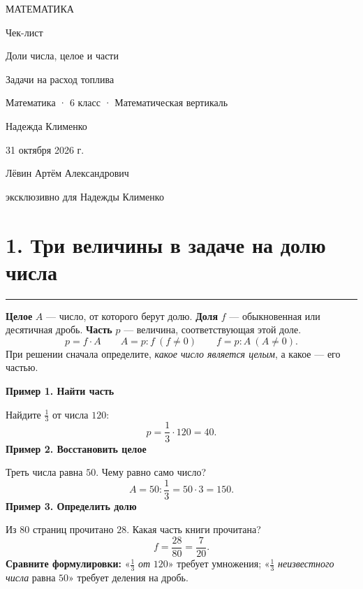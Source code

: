 \documentclass[a4paper,12pt]{article}
\newcommand{\sect}[1]{\section*{#1}\vspace{-3pt}\noindent\textcolor{accent}{\rule{\linewidth}{0.5pt}}\vspace{3pt}}
\newcommand{\key}[1]{\textcolor{darkaccent}{\textbf{#1}}}
\newcommand{\ex}[1]{\medskip\noindent\textcolor{darkaccent}{\textbf{#1}}\par\vspace{-1mm}}
\begin{document}
\thispagestyle{empty}
\begin{center}
\vspace*{28mm}
{\Large\textcolor{darkaccent}{МАТЕМАТИКА}}\par
\vspace{21mm}
{\LARGE Чек-лист}\par
\vspace{14mm}
{\LARGE\textcolor{accent}{Доли числа, целое и части}}\par
\vspace{2mm}
{\LARGE\textcolor{accent}{Задачи на расход топлива}}\par
\vspace{12mm}
{\large Математика · 6 класс · Математическая вертикаль}\par
\vfill
{\large Надежда Клименко}\par
\vspace{12mm}
{\large 31 октября 2026 г.}\par
\vspace{18mm}
{\normalsize Лёвин Артём Александрович}\par
{\normalsize эксклюзивно для Надежды Клименко}\par
\vspace{15mm}
\end{center}
\clearpage

\sect{1. Три величины в задаче на долю числа}
\key{Целое} $A$ --- число, от которого берут долю. \key{Доля} $f$ --- обыкновенная или десятичная дробь. \key{Часть} $p$ --- величина, соответствующая этой доле.
\[
p=f\cdot A\qquad
A=p:f\ (f\ne0)\qquad
f=p:A\ (A\ne0).
\]
При решении сначала определите, \emph{какое число является целым}, а какое --- его частью.

\ex{Пример 1. Найти часть}
Найдите $\frac13$ от числа $120$:
\[
p=\frac13\cdot120=40.
\]
\ex{Пример 2. Восстановить целое}
Треть числа равна $50$. Чему равно само число?
\[
A=50:\frac13=50\cdot3=150.
\]
\ex{Пример 3. Определить долю}
Из $80$ страниц прочитано $28$. Какая часть книги прочитана?
\[
f=\frac{28}{80}=\frac7{20}.
\]
\key{Сравните формулировки:} «$\frac13$ \emph{от} $120$» требует умножения; «$\frac13$ \emph{неизвестного числа} равна $50$» требует деления на дробь.
\end{document}
